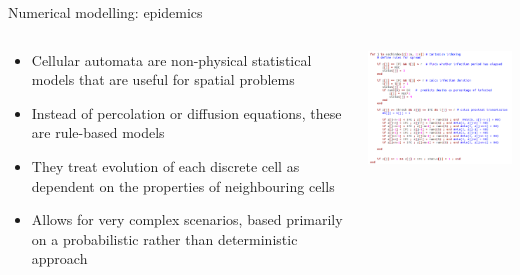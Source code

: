 \begin{frame}{\insertsectionnumber{ |} Numerical modelling: epidemics}

\begin{columns}
\hspace*{-0.25cm}\column[c]{4cm}




\begin{beamerboxesrounded}[lower=gray,shadow=true]{

\begin{itemize}
\item Cellular automata are non-physical statistical models that are useful for spatial problems
\item Instead of percolation or diffusion equations, these are rule-based models
\item They treat evolution of each discrete cell as dependent on the properties of neighbouring cells
\item Allows for very complex scenarios, based primarily on a probabilistic rather than deterministic approach
\end{itemize}

}

\end{beamerboxesrounded}


\hspace*{-0.65cm}\column[c]{7.5cm}

\centering\includegraphics[width=7.5cm]{images/epi2D_1.png}\\

\end{columns}

\end{frame}

